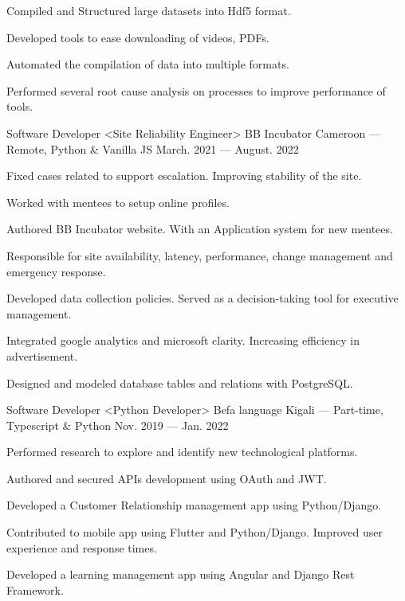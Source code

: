 \begin{cventries}
{\begin{cvitems}
        \item {Compiled and Structured large datasets into Hdf5 format.}
        \item {Developed tools to ease downloading of videos, PDFs.}
        \item {Automated the compilation of data into multiple formats.}
        \item {Performed several root cause analysis on processes to improve performance of tools.}
      \end{cvitems}
    }
  \cventry
    {Software Developer <Site Reliability Engineer>}
    {BB Incubator}
    {Cameroon --- Remote, Python \& Vanilla JS}
    {March. 2021 --- August. 2022}
    {
      \begin{cvitems}
        \item {Fixed cases related to support escalation. Improving stability of the site.}
        \item {Worked with mentees to setup online profiles.}
        \item {Authored BB Incubator website. With an Application system for new mentees.}
        \item {Responsible for site availability, latency, performance, change management and emergency response.}
        \item {Developed data collection policies. Served as a decision-taking tool for executive management.}
        \item {Integrated google analytics and microsoft clarity. Increasing efficiency in advertisement.}
        \item {Designed and modeled database tables and relations with PostgreSQL.}
      \end{cvitems}
    }
  \cventry
    {Software Developer <Python Developer>}
    {Befa language}
    {Kigali --- Part-time, Typescript \& Python}
    {Nov. 2019 --- Jan. 2022}
    {
      \begin{cvitems}
        \item {Performed research to explore and identify new technological platforms.}
        \item {Authored and secured APIs development using OAuth and JWT.}
        \item {Developed a Customer Relationship management app using  Python/Django.}
        \item {Contributed to mobile app using Flutter and Python/Django. Improved user experience and response times.}
        \item {Developed a learning management app using Angular and Django Rest Framework.}

\end{cvitems}}
\end{cventries}
